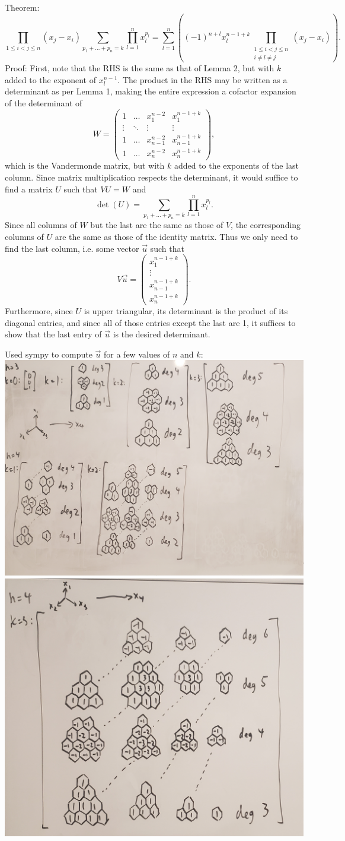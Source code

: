 \documentclass{article}
\begin{document}
Theorem:
\[\prod_{1 \leq i < j \leq n} (x_j-x_i) \sum_{p_1+\ldots+p_n=k} \prod_{l=1}^n x_l^{p_l} = 
\sum_{l=1}^n\left((-1)^{n+l}x_l^{n-1+k}\prod_{\substack{1 \leq i < j \leq n \\ i \neq l \neq j}}(x_j-x_i)\right).
\]
Proof: First, note that the RHS is the same as that of Lemma 2,
but with $k$ added to the exponent of $x_l^{n-1}$.
The product in the RHS may be written as a determinant as per Lemma 1,
making the entire expression a cofactor expansion of the determinant of
\[
W=
\begin{pmatrix}
  1 & \ldots & x_1^{n-2} & x_1^{n-1+k} \\
  \vdots & \ddots & \vdots & \vdots \\
  1 & \ldots & x_{n-1}^{n-2} & x_{n-1}^{n-1+k} \\
  1 & \ldots & x_n^{n-2} & x_n^{n-1+k}
\end{pmatrix},
\]
which is the Vandermonde matrix, but with $k$ added to the exponents of the last column.
Since matrix multiplication respects the determinant,
it would suffice to find a matrix $U$ such that $VU=W$ and
\[\det(U) = \sum_{p_1+\ldots+p_n=k} \prod_{l=1}^n x_l^{p_l}.\]
Since all columns of $W$ but the last are the same as those of $V$,
the corresponding columns of $U$ are the same as those of the identity matrix.
Thus we only need to find the last column,
i.e. some vector $\vec{u}$ such that
\[
V\vec{u} =
\begin{pmatrix}
  x_1^{n-1+k} \\
  \vdots \\
  x_{n-1}^{n-1+k} \\
  x_n^{n-1+k}
\end{pmatrix}.
\]
Furthermore, since $U$ is upper triangular,
its determinant is the product of its diagonal entries,
and since all of those entries except the last are 1,
it suffices to show that the last entry of $\vec{u}$ is the desired determinant.

\newpage

Used sympy to compute $\vec{u}$ for a few values of $n$ and $k$: \\
\includegraphics[width=0.5\linewidth]{u2.jpg}
\includegraphics[width=0.5\linewidth]{u1.jpg}
\end{document}
